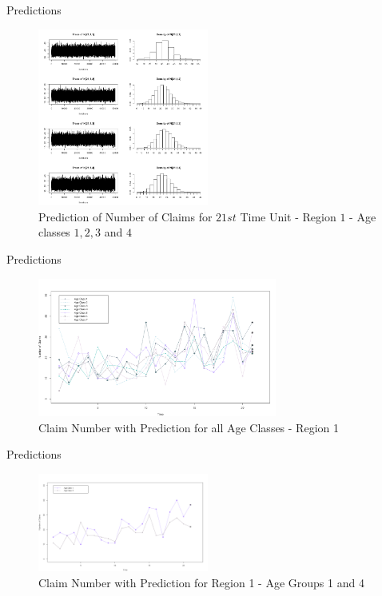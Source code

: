\documentclass[10pt]{beamer} %
\begin{document}
\begin{frame}{Predictions}
    \begin{figure}[H]
    \centering
    \includegraphics[width=0.5\textwidth ]{N21_1.png}
    \caption{Prediction of Number of Claims for $21st$ Time Unit - Region $1$ - Age classes $1,2, 3$ and $4$}
    \label{predictionN1}
\end{figure}
\end{frame}

\begin{frame}{Predictions}
    \begin{figure}[H]
    \centering
    \includegraphics[width=0.7\textwidth ]{N_pred_REGION1.png}
    \caption{Claim Number with Prediction for all Age Classes - Region 1 }
    \label{predictionN_REGION1}
\end{figure}
\end{frame}

\begin{frame}{Predictions}
    \begin{figure}[H]
    \centering
    \includegraphics[width=0.5\textwidth ]{N_pred_AGE1&4_REGION1.png}
    \caption{Claim Number with Prediction for Region 1 - Age Groups 1 and 4 }
    \label{predictionN_AGE1and4}
\end{figure}
\end{frame}
\end{document}
